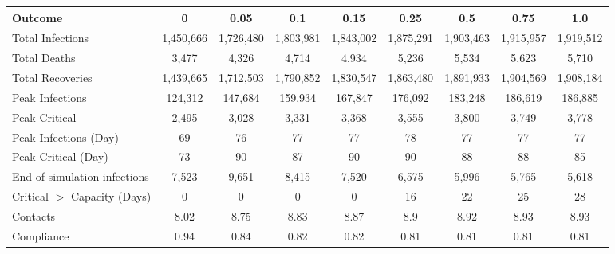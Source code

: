 \begin{table}[ht]
\centering
\begin{tabular}{lcccccccc}
  \toprule
Outcome & 0 & 0.05 & 0.1 & 0.15 & 0.25 & 0.5 & 0.75 & 1.0 \\ 
  \midrule
Total Infections & 1,450,666 & 1,726,480 & 1,803,981 & 1,843,002 & 1,875,291 & 1,903,463 & 1,915,957 & 1,919,512 \\ 
  Total Deaths &     3,477 &     4,326 &     4,714 &     4,934 &     5,236 &     5,534 &     5,623 &     5,710 \\ 
  Total Recoveries & 1,439,665 & 1,712,503 & 1,790,852 & 1,830,547 & 1,863,480 & 1,891,933 & 1,904,569 & 1,908,184 \\ 
  Peak Infections &   124,312 &   147,684 &   159,934 &   167,847 &   176,092 &   183,248 &   186,619 &   186,885 \\ 
  Peak Critical &     2,495 &     3,028 &     3,331 &     3,368 &     3,555 &     3,800 &     3,749 &     3,778 \\ 
  Peak Infections (Day) &        69 &        76 &        77 &        77 &        78 &        77 &        77 &        77 \\ 
  Peak Critical (Day) &        73 &        90 &        87 &        90 &        90 &        88 &        88 &        85 \\ 
  End of simulation infections &     7,523 &     9,651 &     8,415 &     7,520 &     6,575 &     5,996 &     5,765 &     5,618 \\ 
  Critical $>$ Capacity (Days) &         0 &         0 &         0 &         0 &        16 &        22 &        25 &        28 \\ 
  Contacts &      8.02 &      8.75 &      8.83 &      8.87 &       8.9 &      8.92 &      8.93 &      8.93 \\ 
  Compliance &      0.94 &      0.84 &      0.82 &      0.82 &      0.81 &      0.81 &      0.81 &      0.81 \\ 
   \bottomrule
\end{tabular}
\end{table}
